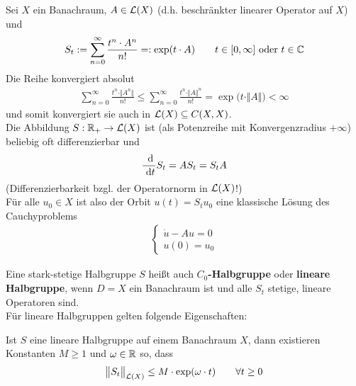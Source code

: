 \begin{beispiel}[Exponentialfunktion]\enter
Sei $X$ ein Banachraum, $A\in\mathcal{L}(X)$ (d.h. beschränkter linearer Operator auf $X$) und 
\begin{align*}
S_t:=\sum\limits_{n=0}^\infty\frac{t^n\cdot A^n}{n!}=:\exp(t\cdot A)\qquad t\in[0,\infty]\text{ oder }t\in\mathbb{C}
\end{align*}
Die Reihe konvergiert absolut
\begin{align*}
\sum\limits_{n=0}^\infty \frac{t^n\cdot\Vert A^n\Vert}{n!}\leq\sum\limits_{n=0}^\infty\frac{t^n\cdot\Vert A\Vert^n}{	n!}=\exp\big(t\cdot\Vert A\Vert\big)<\infty
\end{align*}
und somit konvergiert sie auch in $\mathcal{L}(X)\subseteq C(X,X)$.\\
Die Abbildung $S:\mathbb{R}_+\to\mathcal{L}(X)$ ist (als Potenzreihe mit Konvergenzradius $+\infty$) beliebig oft differenzierbar und 
\begin{align*}
\frac{\text{ d}}{\text{ d} t}S_t=AS_t=S_tA
\end{align*}
(Differenzierbarkeit bzgl. der Operatornorm in $\mathcal{L}(X)$!)\\
Für alle $u_0\in X$ ist also der Orbit $u(t)=S_t u_0$ eine klassische Lösung des Cauchyproblems
\begin{align*}
\left\lbrace\begin{array}{r}
\dot{u}-Au=0\\
u(0)=u_0
\end{array}\right.
\end{align*}
\end{beispiel}

\begin{beispiel}\enter
Eine stark-stetige Halbgruppe $S$ heißt auch \textbf{$C_0$-Halbgruppe} oder \textbf{lineare Halbgruppe}, wenn $D=X$ ein Banachraum ist und alle $S_t$ stetige, lineare Operatoren sind.\\
Für lineare Halbgruppen gelten folgende Eigenschaften:
\end{beispiel}

\begin{lemma}
Ist $S$ eine lineare Halbgruppe auf einem Banachraum $X$, dann existieren Konstanten $M\geq1$ und $\omega\in\mathbb{R}$ so, dass 
\begin{align*}
\big\Vert S_t\big\Vert_{\mathcal{L}(X)}\leq M\cdot\exp(\omega\cdot t)\qquad\forall t\geq0
\end{align*}
\end{lemma}

